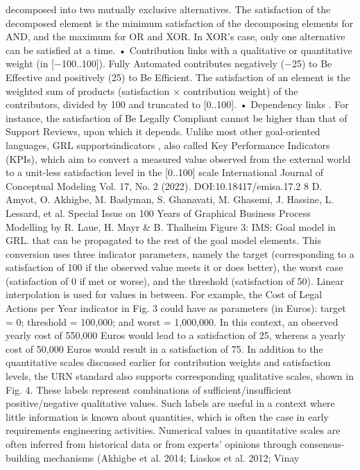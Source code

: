 decomposed into two mutually exclusive alternatives. The satisfaction of the decomposed
element is the minimum satisfaction of the
decomposing elements for AND, and the maximum for OR and XOR. In XOR’s case, only
one alternative can be satisfied at a time.
• Contribution links with a qualitative or
quantitative weight (in [−100..100]). Fully Automated contributes negatively (−25) to Be Effective and positively (25) to Be Efficient. The
satisfaction of an element is the weighted sum of
products (satisfaction × contribution weight) of
the contributors, divided by 100 and truncated
to [0..100].
• Dependency links . For instance, the
satisfaction of Be Legally Compliant cannot be
higher than that of Support Reviews, upon which
it depends.
Unlike most other goal-oriented languages,
GRL supportsindicators , also called Key Performance Indicators (KPIs), which aim to convert
a measured value observed from the external world
to a unit-less satisfaction level in the [0..100] scale
International Journal of Conceptual Modeling
Vol. 17, No. 2 (2022). DOI:10.18417/emisa.17.2
8 D. Amyot, O. Akhigbe, M. Baslyman, S. Ghanavati, M. Ghasemi, J. Hassine, L. Lessard, et al.
Special Issue on 100 Years of Graphical Business Process Modelling by R. Laue, H. Mayr & B. Thalheim
Figure 3: IMS: Goal model in GRL.
that can be propagated to the rest of the goal model
elements. This conversion uses three indicator
parameters, namely the target (corresponding to a
satisfaction of 100 if the observed value meets it or
does better), the worst case (satisfaction of 0 if met
or worse), and the threshold (satisfaction of 50).
Linear interpolation is used for values in between.
For example, the Cost of Legal Actions per Year
indicator in Fig. 3 could have as parameters (in
Euros): target = 0; threshold = 100,000; and worst
= 1,000,000. In this context, an observed yearly
cost of 550,000 Euros would lead to a satisfaction
of 25, whereas a yearly cost of 50,000 Euros would
result in a satisfaction of 75.
In addition to the quantitative scales discussed
earlier for contribution weights and satisfaction
levels, the URN standard also supports corresponding qualitative scales, shown in Fig. 4. These
labels represent combinations of sufficient/insufficient positive/negative qualitative values. Such
labels are useful in a context where little information is known about quantities, which is often
the case in early requirements engineering activities. Numerical values in quantitative scales are
often inferred from historical data or from experts’
opinions through consensus-building mechanisms
(Akhigbe et al. 2014; Liaskos et al. 2012; Vinay
